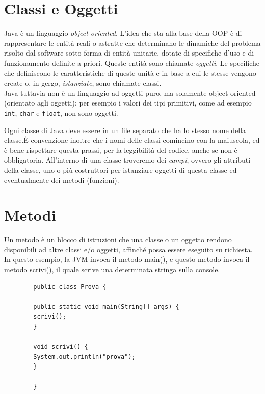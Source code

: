 \documentclass[a4paper,12 pt]{article}
\begin{document}
	\section{Classi e Oggetti}
	
	Java è un linguaggio\textit{ object-oriented}. L'idea che sta alla base della OOP è di rappresentare le entità reali o astratte che determinano le dinamiche del problema risolto dal software sotto forma di entità unitarie, dotate di specifiche d'uso e di funzionamento definite a priori. Queste entità sono chiamate \textit{oggetti}. Le specifiche che definiscono le caratteristiche di queste unità e in base a cui le stesse vengono create o, in gergo, \textit{istanziate}, sono chiamate classi.\\
	
	\noindent Java tuttavia non è un linguaggio ad oggetti puro, ma solamente object oriented (orientato agli oggetti): per esempio i valori dei tipi primitivi, come ad esempio \texttt{int}, \texttt{char} e \texttt{float},  non sono oggetti.
	
	\noindent Ogni classe di Java deve essere in un file separato che ha lo stesso nome della classe.È convenzione inoltre che i nomi delle classi comincino con la maiuscola, ed è bene rispettare questa prassi, per la leggibilità del codice, anche se non è obbligatoria. All'interno di una classe troveremo dei \textit{campi}, ovvero gli attributi della classe, uno o più costruttori per istanziare oggetti di questa classe ed eventualmente dei metodi (funzioni). \\
	
	\section{Metodi}
	
	Un metodo è un blocco di istruzioni che una classe o un oggetto rendono disponibili ad altre classi e/o oggetti, affinché possa essere eseguito su richiesta. \\
	In questo esempio, la JVM invoca il metodo main(), e questo metodo invoca il metodo scrivi(), il quale scrive una determinata stringa sulla console.
	
	\begin{lstlisting}
		public class Prova {
		
		public static void main(String[] args) {
		scrivi();
		}
		
		void scrivi() {
		System.out.println("prova");
		}
		
		}
	\end{lstlisting}
\end{document}
